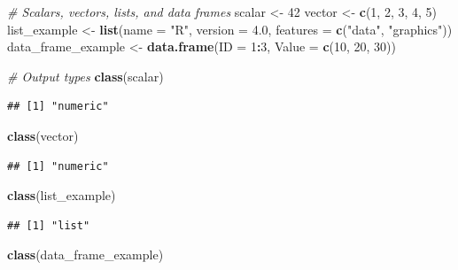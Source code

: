 \documentclass[
]{article}
\newenvironment{Shaded}{\begin{snugshade}}{\end{snugshade}}
\newcommand{\CommentTok}[1]{\textcolor[rgb]{0.56,0.35,0.01}{\textit{#1}}}
\newcommand{\DataTypeTok}[1]{\textcolor[rgb]{0.13,0.29,0.53}{#1}}
\newcommand{\DecValTok}[1]{\textcolor[rgb]{0.00,0.00,0.81}{#1}}
\newcommand{\FloatTok}[1]{\textcolor[rgb]{0.00,0.00,0.81}{#1}}
\newcommand{\KeywordTok}[1]{\textcolor[rgb]{0.13,0.29,0.53}{\textbf{#1}}}
\newcommand{\NormalTok}[1]{#1}
\newcommand{\OperatorTok}[1]{\textcolor[rgb]{0.81,0.36,0.00}{\textbf{#1}}}
\newcommand{\StringTok}[1]{\textcolor[rgb]{0.31,0.60,0.02}{#1}}
\begin{document}
\begin{Shaded}
\begin{Highlighting}[]
\CommentTok{# Scalars, vectors, lists, and data frames}
\NormalTok{scalar <-}\StringTok{ }\DecValTok{42}
\NormalTok{vector <-}\StringTok{ }\KeywordTok{c}\NormalTok{(}\DecValTok{1}\NormalTok{, }\DecValTok{2}\NormalTok{, }\DecValTok{3}\NormalTok{, }\DecValTok{4}\NormalTok{, }\DecValTok{5}\NormalTok{)}
\NormalTok{list_example <-}\StringTok{ }\KeywordTok{list}\NormalTok{(}\DataTypeTok{name =} \StringTok{"R"}\NormalTok{, }\DataTypeTok{version =} \FloatTok{4.0}\NormalTok{, }\DataTypeTok{features =} \KeywordTok{c}\NormalTok{(}\StringTok{"data"}\NormalTok{, }\StringTok{"graphics"}\NormalTok{))}
\NormalTok{data_frame_example <-}\StringTok{ }\KeywordTok{data.frame}\NormalTok{(}\DataTypeTok{ID =} \DecValTok{1}\OperatorTok{:}\DecValTok{3}\NormalTok{, }\DataTypeTok{Value =} \KeywordTok{c}\NormalTok{(}\DecValTok{10}\NormalTok{, }\DecValTok{20}\NormalTok{, }\DecValTok{30}\NormalTok{))}

\CommentTok{# Output types}
\KeywordTok{class}\NormalTok{(scalar)}
\end{Highlighting}
\end{Shaded}

\begin{verbatim}
## [1] "numeric"
\end{verbatim}

\begin{Shaded}
\begin{Highlighting}[]
\KeywordTok{class}\NormalTok{(vector)}
\end{Highlighting}
\end{Shaded}

\begin{verbatim}
## [1] "numeric"
\end{verbatim}

\begin{Shaded}
\begin{Highlighting}[]
\KeywordTok{class}\NormalTok{(list_example)}
\end{Highlighting}
\end{Shaded}

\begin{verbatim}
## [1] "list"
\end{verbatim}

\begin{Shaded}
\begin{Highlighting}[]
\KeywordTok{class}\NormalTok{(data_frame_example)}
\end{Highlighting}
\end{Shaded}
\end{document}
